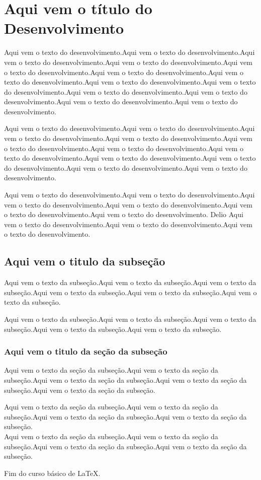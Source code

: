 \documentclass[a4paper,12pt]{article}
\begin{document}
   \section{Aqui vem o título do Desenvolvimento}
   Aqui vem o texto do desenvolvimento.Aqui vem o texto do desenvolvimento.Aqui vem o texto do desenvolvimento.Aqui vem o texto do desenvolvimento.Aqui vem o texto do desenvolvimento.Aqui vem o texto do desenvolvimento.Aqui vem o texto do desenvolvimento.Aqui vem o texto do desenvolvimento.Aqui vem o texto do desenvolvimento.Aqui vem o texto do desenvolvimento.Aqui vem o texto do desenvolvimento.Aqui vem o texto do desenvolvimento.Aqui vem o texto do desenvolvimento.
   
   Aqui vem o texto do desenvolvimento.Aqui vem o texto do desenvolvimento.Aqui vem o texto do desenvolvimento.Aqui vem o texto do desenvolvimento.Aqui vem o texto do desenvolvimento.Aqui vem o texto do desenvolvimento.Aqui vem o texto do desenvolvimento.Aqui vem o texto do desenvolvimento.Aqui vem o texto do desenvolvimento.Aqui vem o texto do desenvolvimento.Aqui vem o texto do desenvolvimento. 
   
   Aqui vem o texto do desenvolvimento.Aqui vem o texto do desenvolvimento.Aqui vem o texto do desenvolvimento.Aqui vem o texto do desenvolvimento.Aqui vem o texto do desenvolvimento.Aqui vem o texto do desenvolvimento. Delio
   \newline Aqui vem o texto do desenvolvimento.Aqui vem o texto do desenvolvimento.Aqui vem o texto do desenvolvimento.
   \subsection{Aqui vem o titulo da subseção}
   Aqui vem o texto da subseção.Aqui vem o texto da subseção.Aqui vem o texto da subseção.Aqui vem o texto da subseção.Aqui vem o texto da subseção.Aqui vem o texto da subseção.
   
   Aqui vem o texto da subseção.Aqui vem o texto da subseção.Aqui vem o texto da subseção.Aqui vem o texto da subseção.Aqui vem o texto da subseção. \cite{meuatalho}
   \subsubsection{Aqui vem o titulo da seção da subseção}
   Aqui vem o texto da seção da subseção.Aqui vem o texto da seção da subseção.Aqui vem o texto da seção da subseção.Aqui vem o texto da seção da subseção.Aqui vem o texto da seção da subseção.
   
   Aqui vem o texto da seção da subseção.Aqui vem o texto da seção da subseção.Aqui vem o texto da seção da subseção.Aqui vem o texto da seção da subseção.\\ Aqui vem o texto da seção da subseção.Aqui vem o texto da seção da subseção.Aqui vem o texto da seção da subseção.Aqui vem o texto da seção da subseção. \cite{meuartigo}
   \newpage
   
   
   
   \newpage
   Fim do curso básico de \LaTeX. 
\end{document}
